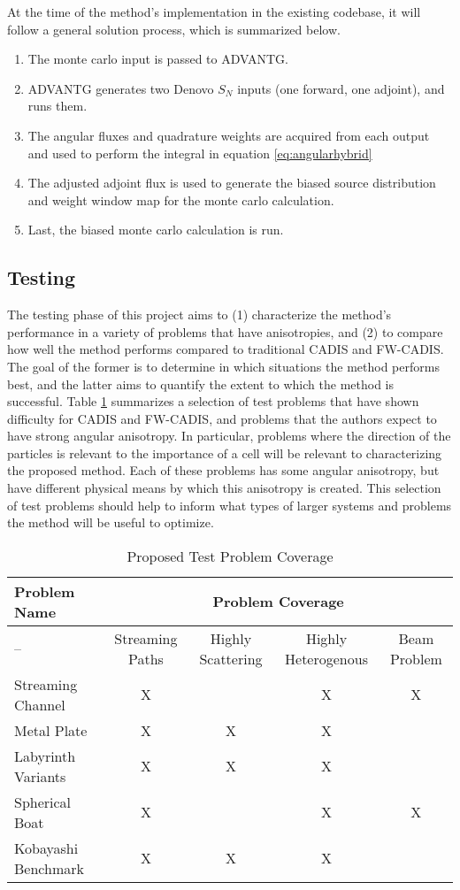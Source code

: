 \documentclass{mc2015}
\begin{document}
At the time of the method's implementation in the existing codebase, it will follow a general solution process, which is summarized below. 
\begin{enumerate}
\item The monte carlo input is passed to ADVANTG. 
\item ADVANTG generates two Denovo $S_N$ inputs (one forward, one adjoint), and runs them.
\item The angular fluxes and quadrature weights are acquired from each output and used to perform the integral in equation \ref{eq:angularhybrid}
\item The adjusted adjoint flux is used to generate the biased source distribution and weight window map for the monte carlo calculation.
\item Last, the biased monte carlo calculation is run. 
\end{enumerate}

\subsection{Testing}
\label{sec:Testing}

The testing phase of this project aims to (1) characterize the method's performance in a variety of problems that have anisotropies, and (2) to compare how well the method performs compared to traditional CADIS and FW-CADIS.
The goal of the former is to determine in which situations the method performs best, and the latter aims to quantify the extent to which the method is successful. 
Table \ref{tab:testprobs} summarizes a selection of test problems that have shown difficulty for CADIS and FW-CADIS, and problems that the authors expect to have strong angular anisotropy. 
In particular, problems where the direction of the particles is relevant to the importance of a cell will be relevant to characterizing the proposed method. Each of these problems has some angular anisotropy, but have different physical means by which this anisotropy is created. This selection of test problems should help to inform what types of larger systems and problems the method will be useful to optimize. 

 \begin{table}
  \centering
  \caption{Proposed Test Problem Coverage}
  \begin{tabular}{l|cccc}
    \toprule
    Problem Name & \multicolumn{4}{c}{Problem Coverage} \\
    \hline
    -- & Streaming Paths & Highly Scattering & Highly Heterogenous & Beam Problem \\
    \hline
    Streaming Channel   & X & & X & X \\ 
    Metal Plate         & X & X & X &  \\
    Labyrinth Variants  & X & X & X &  \\ 
    Spherical Boat      & X & & X & X \\  
    Kobayashi Benchmark & X & X & X &  \\   
	\bottomrule
  \end{tabular}
  \label{tab:testprobs}
\end{table}
\end{document}
